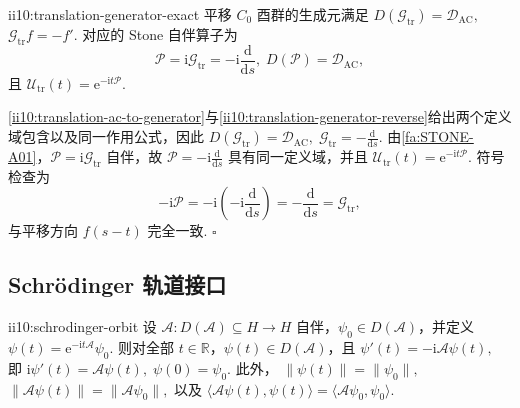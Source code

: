 \begin{FATheorem}{ii10:translation-generator-exact}
平移 \(\displaystyle C_0\) 酉群的生成元满足 \(\displaystyle D(\mathcal G_{\mathrm{tr}})=\mathcal D_{\mathrm{AC}},\) \(\displaystyle \mathcal G_{\mathrm{tr}}f=-f'.\)
对应的 Stone 自伴算子为
\[
\mathcal P
=
\mathrm{i}\mathcal G_{\mathrm{tr}}
=
-\mathrm{i}\frac{\mathrm{d}}{\mathrm{d}s},
\;
D(\mathcal P)=\mathcal D_{\mathrm{AC}},
\]
且 \(\displaystyle \mathcal U_{\mathrm{tr}}(t) = \mathrm{e}^{-\mathrm{i}t\mathcal P}.\)
\end{FATheorem}

\begin{FAProof}
\autoref{ii10:translation-ac-to-generator}与\autoref{ii10:translation-generator-reverse}给出两个定义域包含以及同一作用公式，因此 \(\displaystyle D(\mathcal G_{\mathrm{tr}})=\mathcal D_{\mathrm{AC}}, \; \mathcal G_{\mathrm{tr}}=-\frac{\mathrm{d}}{\mathrm{d}s}.\)
由\autoref{fa:STONE-A01}，\(\displaystyle\mathcal P=\mathrm{i}\mathcal G_{\mathrm{tr}}\) 自伴，故 \(\displaystyle \mathcal P = -\mathrm{i}\frac{\mathrm{d}}{\mathrm{d}s}\)
具有同一定义域，并且 \(\displaystyle\mathcal U_{\mathrm{tr}}(t)=\mathrm{e}^{-\mathrm{i}t\mathcal P}\). 符号检查为
\[
-\mathrm{i}\mathcal P
=
-\mathrm{i}
\left(-\mathrm{i}\frac{\mathrm{d}}{\mathrm{d}s}\right)
=
-\frac{\mathrm{d}}{\mathrm{d}s}
=
\mathcal G_{\mathrm{tr}},
\]
与平移方向 \(\displaystyle f(s-t)\) 完全一致.
\hfill\(\square\)
\end{FAProof}

\subsection{Schrödinger 轨道接口}

\begin{FAProposition}{ii10:schrodinger-orbit}
设 \(\displaystyle\mathcal A:D(\mathcal A)\subseteq H\to H\) 自伴，\(\displaystyle\psi_0\in D(\mathcal A)\)，并定义 \(\displaystyle \psi(t)=\mathrm{e}^{-\mathrm{i}t\mathcal A}\psi_0.\)
则对全部 \(\displaystyle t\in\mathbb R\)，\(\displaystyle\psi(t)\in D(\mathcal A)\)，且 \(\displaystyle \psi'(t)=-\mathrm{i}\mathcal A\psi(t),\)
即 \(\displaystyle \mathrm{i}\psi'(t)=\mathcal A\psi(t), \; \psi(0)=\psi_0.\)
此外， \(\displaystyle \|\psi(t)\|=\|\psi_0\|,\) \(\displaystyle \|\mathcal A\psi(t)\|=\|\mathcal A\psi_0\|,\)
以及 \(\displaystyle \langle\mathcal A\psi(t),\psi(t)\rangle = \langle\mathcal A\psi_0,\psi_0\rangle.\)
\end{FAProposition}

